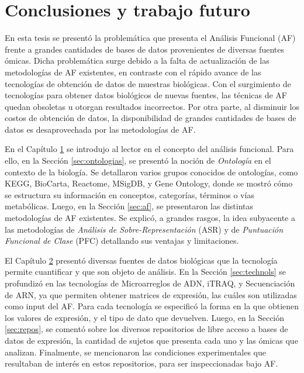 \documentclass[12pt,twoside]{reedthesis}
\begin{document}
\hypertarget{cap:conclusiones}{%
\chapter{Conclusiones y trabajo futuro}\label{cap:conclusiones}}

\par

En esta tesis se presentó la problemática que presenta el Análisis Funcional (AF) frente a grandes cantidades de bases de datos provenientes de diversas fuentes ómicas. Dicha problemática surge debido a la falta de actualización de las metodologías de AF existentes, en contraste con el rápido avance de las tecnologías de obtención de datos de muestras biológicas. Con el surgimiento de tecnologías para obtener datos biológicos de nuevas fuentes, las técnicas de AF quedan obsoletas u otorgan resultados incorrectos. Por otra parte, al disminuir los costos de obtención de datos, la disponibilidad de grandes cantidades de bases de datos es desaprovechada por las metodologías de AF.

\par

En el Capítulo \protect\hyperlink{cap:af}{1} se introdujo al lector en el concepto del análisis funcional. Para ello, en la Sección \ref{sec:ontologias}, se presentó la noción de \emph{Ontología} en el contexto de la biología. Se detallaron varios grupos conocidos de ontologías, como KEGG, BioCarta, Reactome, MSigDB, y Gene Ontology, donde se mostró cómo se estructura su información en conceptos, categorías, términos o vías metabólicas. Luego, en la Sección \ref{sec:af}, se presentaron las distintas metodologías de AF existentes. Se explicó, a grandes rasgos, la idea subyacente a las metodologías de \emph{Análisis de Sobre-Representación} (ASR) y de \emph{Puntuación Funcional de Clase} (PFC) detallando sus ventajas y limitaciones.

\par

El Capítulo \protect\hyperlink{cap:ngs}{2} presentó diversas fuentes de datos biológicas que la tecnología permite cuantificar y que son objeto de análisis. En la Sección \ref{sec:technols} se profundizó en las tecnologías de Microarreglos de ADN, iTRAQ, y Secuenciación de ARN, ya que permiten obtener matrices de expresión, las cuáles son utilizadas como input del AF. Para cada tecnología se especificó la forma en la que obtienen los valores de expresión, y el tipo de dato que devuelven. Luego, en la Sección \ref{sec:repos}, se comentó sobre los diversos repositorios de libre acceso a bases de datos de expresión, la cantidad de sujetos que presenta cada uno y las ómicas que analizan. Finalmente, se mencionaron las condiciones experimentales que resultaban de interés en estos repositorios, para ser inspeccionadas bajo AF.
\end{document}

